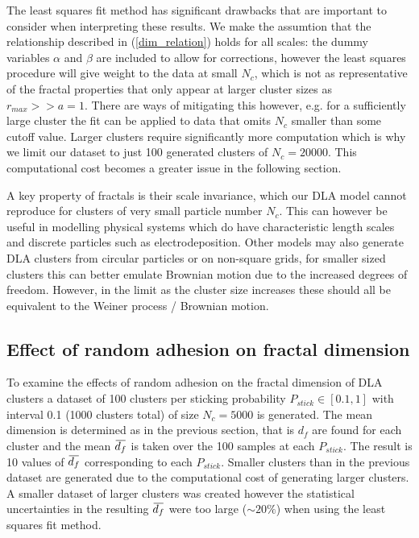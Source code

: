 \documentclass[10pt, twocolumn]{article} %
\newcommand{\overbar}[1]{\mkern 1.5mu\overline{\mkern-1.5mu#1\mkern-1.5mu}\mkern 1.5mu}
\begin{document}
  The least squares fit method has significant drawbacks that are important to consider when interpreting these results. We make the assumtion that the relationship described in (\ref{dim_relation}) holds for all scales: the dummy variables $\alpha$ and $\beta$ are included to allow for corrections, however the least squares procedure will give weight to the data at small $N_c$, which is not as representative of the fractal properties that only appear at larger cluster sizes as $r_{max} >> a=1$. There are ways of mitigating this however, e.g. for a sufficiently large cluster the fit can be applied to data that omits $N_c$ smaller than some cutoff value. Larger clusters require significantly more computation which is why we limit our dataset to just 100 generated clusters of $N_c = 20000$. This computational cost becomes a greater issue in the following section.

  A key property of fractals is their scale invariance, which our DLA model cannot reproduce for clusters of very small particle number $N_c$. This can however be useful in modelling physical systems which do have characteristic length scales and discrete particles such as electrodeposition\cite{Shaikh_2022}. Other models may also generate DLA clusters from circular particles or on non-square grids, for smaller sized clusters this can better emulate Brownian motion due to the increased degrees of freedom. However, in the limit as the cluster size increases these should all be equivalent to the Weiner process / Brownian motion.

\subsection*{Effect of random adhesion on fractal dimension}
To examine the effects of random adhesion on the fractal dimension of DLA clusters a dataset of 100 clusters per sticking probability $P_{stick}\in[0.1, 1]$ with interval 0.1 (1000 clusters total) of size $N_c = 5000$ is generated. The mean dimension is determined as in the previous section, that is $d_f$ are found for each cluster and the mean $\overbar{d_f}$ is taken over the 100 samples at each $P_{stick}$. The result is 10 values of $\overbar{d_f}$ corresponding to each $P_{stick}$. Smaller clusters than in the previous dataset are generated due to the computational cost of generating larger clusters. A smaller dataset of larger clusters was created however the statistical uncertainties in the resulting $\overbar{d_f}$ were too large ($\sim 20\%$) when using the least squares fit method.
\end{document}
